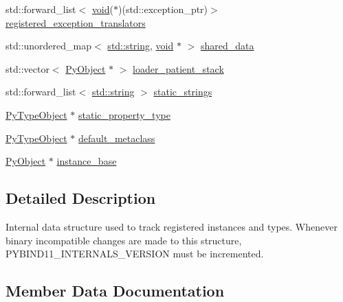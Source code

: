 \begin{DoxyCompactItemize}
\item 
std\+::forward\+\_\+list$<$ \mbox{\hyperlink{_s_d_l__opengles2__gl2ext_8h_ae5d8fa23ad07c48bb609509eae494c95}{void}}($\ast$)(std\+::exception\+\_\+ptr)$>$ \mbox{\hyperlink{structinternals_a77114b8520f529d44be95aa700a7cd29}{registered\+\_\+exception\+\_\+translators}}
\item 
std\+::unordered\+\_\+map$<$ \mbox{\hyperlink{_s_d_l__opengl__glext_8h_ab4ccfaa8ab0e1afaae94dc96ef52dde1}{std\+::string}}, \mbox{\hyperlink{_s_d_l__opengles2__gl2ext_8h_ae5d8fa23ad07c48bb609509eae494c95}{void}} $\ast$ $>$ \mbox{\hyperlink{structinternals_ad52baba07c7497fa2797e7db740707f4}{shared\+\_\+data}}
\item 
std\+::vector$<$ \mbox{\hyperlink{_python27_2object_8h_aadc84ac7aed2cfa6f20c25f62bf3dac7}{Py\+Object}} $\ast$ $>$ \mbox{\hyperlink{structinternals_a4584170bdf82fabe271d296055c75ff7}{loader\+\_\+patient\+\_\+stack}}
\item 
std\+::forward\+\_\+list$<$ \mbox{\hyperlink{_s_d_l__opengl__glext_8h_ab4ccfaa8ab0e1afaae94dc96ef52dde1}{std\+::string}} $>$ \mbox{\hyperlink{structinternals_ad322abbf9d8c4915221324444ab33192}{static\+\_\+strings}}
\item 
\mbox{\hyperlink{_python27_2object_8h_a42a55dd6e973872c7a6bc61632070f6f}{Py\+Type\+Object}} $\ast$ \mbox{\hyperlink{structinternals_a6115d4d47cb0cf54c97b9f2b772054c8}{static\+\_\+property\+\_\+type}}
\item 
\mbox{\hyperlink{_python27_2object_8h_a42a55dd6e973872c7a6bc61632070f6f}{Py\+Type\+Object}} $\ast$ \mbox{\hyperlink{structinternals_a661c7e4987fe016874efc57ae26873df}{default\+\_\+metaclass}}
\item 
\mbox{\hyperlink{_python27_2object_8h_aadc84ac7aed2cfa6f20c25f62bf3dac7}{Py\+Object}} $\ast$ \mbox{\hyperlink{structinternals_ad18c3a70ddfa0ec128e4f8013f81c6bd}{instance\+\_\+base}}
\end{DoxyCompactItemize}


\subsection{Detailed Description}
Internal data structure used to track registered instances and types. Whenever binary incompatible changes are made to this structure, {\ttfamily P\+Y\+B\+I\+N\+D11\+\_\+\+I\+N\+T\+E\+R\+N\+A\+L\+S\+\_\+\+V\+E\+R\+S\+I\+ON} must be incremented. 

\subsection{Member Data Documentation}
\mbox{\label{structinternals_a661c7e4987fe016874efc57ae26873df}} 
